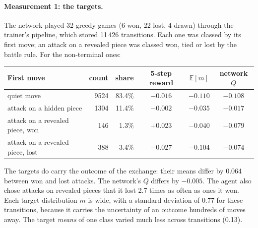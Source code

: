 \paragraph{Measurement 1: the targets.} The network played 32 greedy games (6 won, 22 lost, 4
drawn) through the trainer's pipeline, which stored 11\,426 transitions. Each one was classed by
its first move; an attack on a revealed piece was classed won, tied or lost by the battle rule.
For the non-terminal ones:
\begin{center}
\small
\begin{tabular}{lrrccc}
\toprule
First move & count & share & 5-step reward & $\mathbb{E}[m]$ & network $Q$ \\
\midrule
quiet move                   & 9524 & 83.4\% & $-0.016$ & $-0.110$ & $-0.108$ \\
attack on a hidden piece     & 1304 & 11.4\% & $-0.002$ & $-0.035$ & $-0.017$ \\
attack on a revealed piece, won  & 146 & 1.3\% & $+0.023$ & $-0.040$ & $-0.079$ \\
attack on a revealed piece, lost & 388 & 3.4\% & $-0.027$ & $-0.104$ & $-0.074$ \\
\bottomrule
\end{tabular}
\end{center}
The targets do carry the outcome of the exchange: their means differ by 0.064 between won and
lost attacks. The network's $Q$ differs by $-0.005$. The agent also chose attacks on revealed pieces
that it lost 2.7 times as often as ones it won. Each target distribution $m$ is wide, with a standard
deviation of 0.77 for these transitions, because it carries the uncertainty of an outcome hundreds
of moves away. The target \emph{means} of one class varied much less across transitions (0.13).

